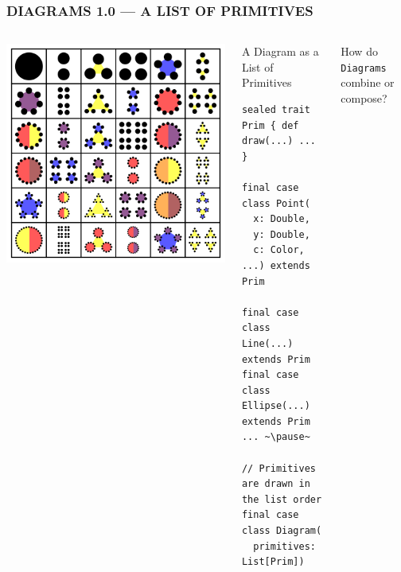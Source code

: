 \documentclass{beamer}
\begin{document}
\begin{frame}[fragile] \frametitle{DIAGRAMS 1.0 --- A LIST OF PRIMITIVES}
  \begin{columns}
      \includegraphics[width=\textwidth]{factorization.png}

      \begin{block}{A Diagram as a List of Primitives}
      \begin{lstlisting}
sealed trait Prim { def draw(...) ... }

final case class Point(
  x: Double,
  y: Double,
  c: Color, ...) extends Prim

final case class Line(...) extends Prim
final case class Ellipse(...) extends Prim
... ~\pause~

// Primitives are drawn in the list order
final case class Diagram(
  primitives: List[Prim])
      \end{lstlisting}
      \vspace{-.5cm}
      \end{block}
  How do \texttt{Diagrams} combine or compose?
  \end{columns}
\end{frame}
\end{document}
